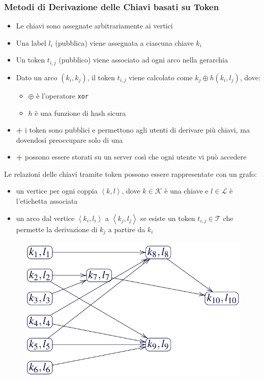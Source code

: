 \documentclass{report}
\begin{document}
\subsubsection{Metodi di Derivazione delle Chiavi basati su Token}
\begin{itemize}
    \item Le chiavi sono assegnate arbitrariamente ai vertici 
    \item Una label $l_i$ (pubblica) viene assegnata a ciascuna chiave $k_i$
    \item Un token $t_{i,j}$ (pubblico) viene associato ad ogni arco nella gerarchia
    \item Dato un arco $(k_i, k_j)$, il token $t_{i,j}$ viene calcolato come $k_j \oplus h(k_i, l_j)$, dove:
    \begin{itemize}
        \item $\oplus$ è l'operatore \texttt{xor}
        \item $h$ è una funzione di hash sicura
    \end{itemize}
    \item \textcolor{darkgreen}{\textbf{+}} i token sono pubblici e permettono agli utenti di derivare più chiavi, ma dovendosi preoccupare solo di una 
    \item \textcolor{darkgreen}{\textbf{+}} possono essere storati su un server così che ogni utente vi può accedere
\end{itemize}

\noindent Le relazioni delle chiavi tramite token possono essere rappresentate con un grafo:
\begin{itemize}
    \item un vertice per ogni coppia $\left\langle k, l \right\rangle$, dove $k \in \mathcal{K}$ è una chiave e $l \in \mathcal{L}$ è l'etichetta associata 
    \item un arco dal vertice $\left\langle k_i, l_i \right\rangle$ a $\left\langle k_j, l_j \right\rangle$ se esiste un token $t_{i,j} \in \mathcal{T}$ che permette la derivazione di $k_j$ a partire da $k_i$
\end{itemize}

\begin{figure}[ht]
    \centering
    \includegraphics[width=0.6\linewidth]{images/encryption/token-based-ex.png}
\end{figure}
\end{document}
